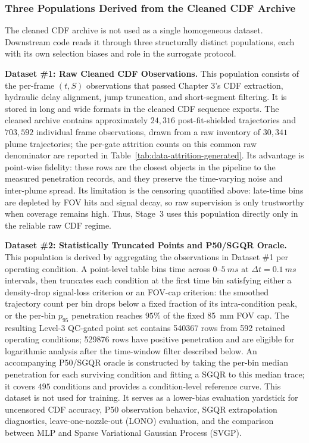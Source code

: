 \subsubsection{Three Populations Derived from the Cleaned CDF Archive}
\label{sec:three-derived-populations-en}

The cleaned CDF archive is not used as a single homogeneous dataset. Downstream code reads it through three structurally distinct populations, each with its own selection biases and role in the surrogate protocol.

\textbf{Dataset \#1: Raw Cleaned CDF Observations.}
This population consists of the per-frame \((t,S)\) observations that passed Chapter 3's CDF extraction, hydraulic delay alignment, jump truncation, and short-segment filtering. It is stored in long and wide formats in the cleaned CDF sequence exports. The cleaned archive contains approximately \(24{,}316\) post-fit-shielded trajectories and \(703{,}592\) individual frame observations, drawn from a raw inventory of \(30{,}341\) plume trajectories; the per-gate attrition counts on this common raw denominator are reported in Table~\ref{tab:data-attrition-generated}. Its advantage is point-wise fidelity: these rows are the closest objects in the pipeline to the measured penetration records, and they preserve the time-varying noise and inter-plume spread. Its limitation is the censoring quantified above: late-time bins are depleted by FOV hits and signal decay, so raw supervision is only trustworthy when coverage remains high. Thus, Stage~3 uses this population directly only in the reliable raw CDF regime.

\textbf{Dataset \#2: Statistically Truncated Points and P50/SGQR Oracle.}
This population is derived by aggregating the observations in Dataset \#1 per operating condition. A point-level table bins time across \(0\)--\(\SI{5}{ms}\) at \(\Delta t=\SI{0.1}{ms}\) intervals, then truncates each condition at the first time bin satisfying either a density-drop signal-loss criterion or an FOV-cap criterion: the smoothed trajectory count per bin drops below a fixed fraction of its intra-condition peak, or the per-bin \(p_{95}\) penetration reaches \(95\%\) of the fixed \SI{85}{mm} FOV cap. The resulting Level-3 QC-gated point set contains \num{540367} rows from \num{592} retained operating conditions; \num{529876} rows have positive penetration and are eligible for logarithmic analysis after the time-window filter described below. An accompanying P50/SGQR oracle is constructed by taking the per-bin median penetration for each surviving condition and fitting a SGQR to this median trace; it covers \(495\) conditions and provides a condition-level reference curve. This dataset is not used for training. It serves as a lower-bias evaluation yardstick for uncensored CDF accuracy, P50 observation behavior, SGQR extrapolation diagnostics, leave-one-nozzle-out (LONO) evaluation, and the comparison between MLP and Sparse Variational Gaussian Process (SVGP).

